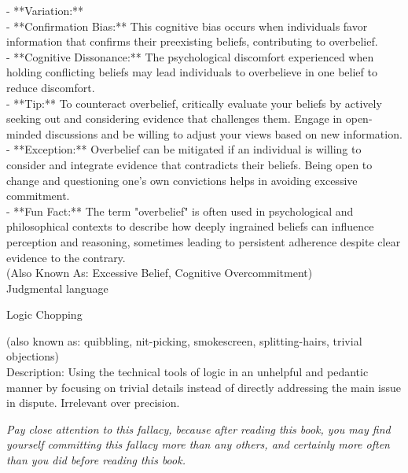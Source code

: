 \documentclass[a4paper,12pt,single,pdftex]{scrartcl}
\begin{document}
    
      - **Variation:**
    \\

    
        - **Confirmation Bias:** This cognitive bias occurs when individuals favor information that confirms their preexisting beliefs, contributing to overbelief.
    \\

    
        - **Cognitive Dissonance:** The psychological discomfort experienced when holding conflicting beliefs may lead individuals to overbelieve in one belief to reduce discomfort.
    \\

    
      - **Tip:** To counteract overbelief, critically evaluate your beliefs by actively seeking out and considering evidence that challenges them. Engage in open-minded discussions and be willing to adjust your views based on new information.
    \\

    
      - **Exception:** Overbelief can be mitigated if an individual is willing to consider and integrate evidence that contradicts their beliefs. Being open to change and questioning one's own convictions helps in avoiding excessive commitment.
    \\

    
      - **Fun Fact:** The term "overbelief" is often used in psychological and philosophical contexts to describe how deeply ingrained beliefs can influence perception and reasoning, sometimes leading to persistent adherence despite clear evidence to the contrary.
    \\

  
    
      (Also Known As: Excessive Belief, Cognitive Overcommitment)
    \\

  

Judgmental language

Logic Chopping
    
      (also known as: quibbling, nit-picking, smokescreen, splitting-hairs, trivial objections)
    \\

  
    Description: Using the technical tools of logic in an unhelpful and pedantic manner by focusing on trivial details instead of directly addressing the main issue in dispute.  Irrelevant over precision.

    
      {\it Pay close attention to this fallacy, because after reading this book, you may find yourself committing this fallacy more than any others, and certainly more often than you did before reading this book.}
    \\
\end{document}
